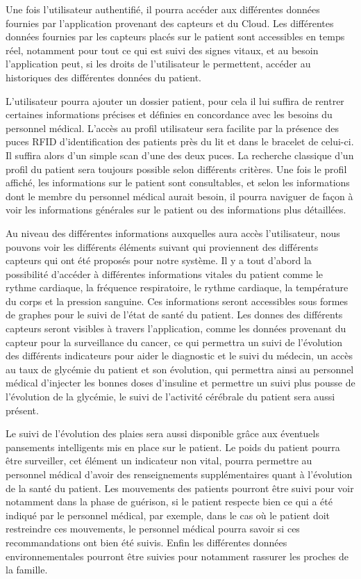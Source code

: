 Une fois l’utilisateur authentifié, il pourra accéder aux différentes données fournies par l’application provenant des capteurs et du Cloud. Les différentes données fournies par les capteurs placés sur le patient sont accessibles en temps réel, notamment pour tout ce qui est suivi des signes vitaux, et au besoin l’application peut, si les droits de l’utilisateur le permettent, accéder au historiques des différentes données du patient.

L’utilisateur pourra ajouter un dossier patient, pour cela il lui suffira de rentrer certaines informations précises et définies en concordance avec les besoins du personnel médical. L’accès au profil utilisateur sera facilite par la présence des puces RFID d’identification des patients près du lit et dans le bracelet de celui-ci. Il suffira alors d’un simple scan d’une des deux puces. La recherche classique d’un profil du patient sera toujours possible selon différents critères. Une fois le profil affiché, les informations sur le patient sont consultables, et selon les informations dont le membre du personnel médical aurait besoin, il pourra naviguer de façon à voir les informations générales sur le patient ou des informations plus détaillées.

Au niveau des différentes informations auxquelles aura accès l’utilisateur, nous pouvons voir les différents éléments suivant qui proviennent des différents capteurs qui ont été proposés pour notre système. Il y a tout d’abord la possibilité d’accéder à différentes informations vitales du patient comme le rythme cardiaque, la fréquence respiratoire, le rythme cardiaque, la température du corps et la pression sanguine. Ces informations seront accessibles sous formes de graphes pour le suivi de l’état de santé du patient. Les donnes des différents capteurs seront visibles à travers l’application, comme les données provenant du capteur pour la surveillance du cancer, ce qui permettra un suivi de l’évolution des différents indicateurs pour aider le diagnostic et le suivi du médecin, un accès au taux de glycémie du patient et son évolution, qui permettra ainsi au personnel médical d’injecter les bonnes doses d’insuline et permettre un suivi plus pousse de l’évolution de la glycémie, le suivi de l’activité cérébrale du patient sera aussi présent.

Le suivi de l’évolution des plaies sera aussi disponible grâce aux éventuels pansements intelligents mis en place sur le patient. Le poids du patient pourra être surveiller, cet élément un indicateur non vital, pourra permettre au personnel médical d’avoir des renseignements supplémentaires quant à l’évolution de la santé du patient. Les mouvements des patients pourront être suivi pour voir notamment dans la phase de guérison, si le patient respecte bien ce qui a été indiqué par le personnel médical, par exemple, dans le cas où le patient doit restreindre ces mouvements, le personnel médical pourra savoir si ces recommandations ont bien été suivis. Enfin les différentes données environnementales pourront être suivies pour notamment rassurer les proches de la famille.

